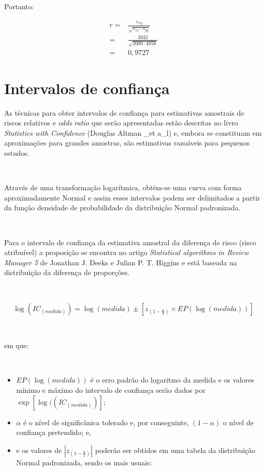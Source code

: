 \documentclass[
]{book}
\providecommand{\tightlist}{%
  \setlength{\itemsep}{0pt}\setlength{\parskip}{0pt}}
\begin{document}
\hfill\break

Portanto:

\hfill\break

\begin{align*}
r = & \frac{{s}_{xy}}{\sqrt{{s}_{xx}\cdot {s}_{yy}}} \\
  = & \frac{3032}{\sqrt{2000 \cdot 4858}} \\
  = & 0,9727
\end{align*}

\hypertarget{intervalos-de-confianuxe7a}{%
\section{Intervalos de confiança}\label{intervalos-de-confianuxe7a}}

As técnicas para obter intervalos de confiança para estimativas amostrais de riscos relativos e \emph{odds ratio} que serão apresentadas estão descritas no livro \emph{Statistics with Confidence} (Douglas Altman \_et a\_l) e, embora se constituam em aproximações para grandes amostras, são estimativas razoáveis para pequenos estudos.

~

Através de uma transformação logarítmica, obtém-se uma curva com forma aproximadamente Normal e assim esses intervalos podem ser delimitados a partir da função densidade de probabilidade da distribuição Normal padronizada.

~

Para o intervalo de confiança da estimativa amostral da diferença de risco (risco atribuível) a proposição se encontra no artigo \emph{Statistical algorithms in Review Manager 5} de Jonathan J. Deeks e Julian P. T. Higgins e está baseada na distribuição da diferença de proporções.

~

\[
\log(IC_{(medida)}) = \log(medida) \pm \left[ z_{(1-\frac{\alpha}{2})} \times EP(\log(medida))\right] 
\]

~

em que:

~

\begin{itemize}
\tightlist
\item
  \(EP(\log(medida))\) é o erro padrão do logaritmo da medida e os valores mínimo e máximo do intervalo de confiança serão dados por \(\exp{[\log((IC_{(medida)})]}\);
\item
  \(\alpha\) é o nível de significânica tolerado e, por conseguinte, \((1-\alpha)\) o nível de confiança pretendido; e,
\item
  e os valores de \(|z_{(1-\frac{\alpha}{2})}|\) poderão ser obtidos em uma tabela da distribuição Normal padronizada, sendo os mais usuais:
\end{itemize}
\end{document}
